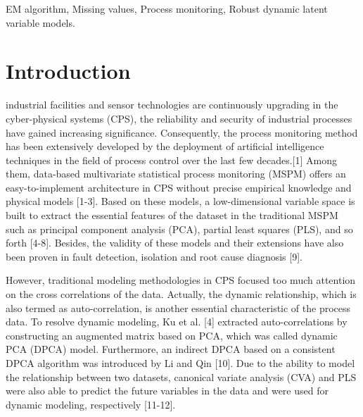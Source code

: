 \documentclass[journal]{IEEEtranTICPS}
\begin{document}
\begin{IEEEkeywords}
EM algorithm, Missing values, Process monitoring, Robust dynamic latent variable models.
\end{IEEEkeywords}

%
{}


\section{Introduction}

 industrial facilities and sensor technologies are continuously upgrading in the cyber-physical systems (CPS), the reliability and security of industrial processes have gained increasing significance. Consequently, the process monitoring method has been extensively developed by the deployment of artificial intelligence techniques in the field of process control over the last few decades.[1] Among them, data-based multivariate statistical process monitoring (MSPM) offers an easy-to-implement architecture in CPS without precise empirical knowledge and physical models [1-3]. Based on these models, a low-dimensional variable space is built to extract the essential features of the dataset in the traditional MSPM such as principal component analysis (PCA), partial least squares (PLS), and so forth [4-8]. Besides, the validity of these models and their extensions have also been proven in fault detection, isolation and root cause diagnosis [9].

However, traditional modeling methodologies in CPS focused too much attention on the cross correlations of the data. Actually, the dynamic relationship, which is also termed as auto-correlation, is another essential characteristic of the process data. To resolve dynamic modeling, Ku et al. [4] extracted auto-correlations by constructing an augmented matrix based on PCA, which was called dynamic PCA (DPCA) model. Furthermore, an indirect DPCA based on a consistent DPCA algorithm was introduced by Li and Qin [10]. Due to the ability to model the relationship between two datasets, canonical variate analysis (CVA) and PLS were also able to predict the future variables in the data and were used for dynamic modeling, respectively [11-12]. 
\end{document}

